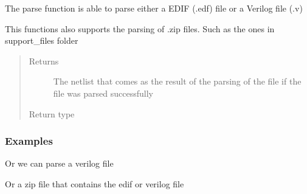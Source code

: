 \documentclass[letterpaper,10pt,english,openany,oneside]{sphinxmanual}
\begin{document}
\begin{fulllineitems}
\label{\detokenize{reference/classes/generated/spydrnet.parse:spydrnet.parse}}
The parse function is able to parse either a EDIF (.edf) file or a Verilog file (.v)

This functions also supports the parsing of .zip files. Such as the ones in support\_files folder
\begin{quote}\begin{description}
\item[{Returns}] \leavevmode
The netlist that comes as the result of the parsing of the file if the file was parsed successfully

\item[{Return type}] \leavevmode
{\hyperref[\detokenize{reference/classes/netlist:spydrnet.Netlist}]{}}

\end{description}\end{quote}
\subsubsection*{Examples}

\begin{sphinxVerbatim}[commandchars=\\\{\}]
   
  
\end{sphinxVerbatim}

Or we can parse a verilog file

\begin{sphinxVerbatim}[commandchars=\\\{\}]
  
\end{sphinxVerbatim}

Or a zip file that contains the edif or verilog file

\begin{sphinxVerbatim}[commandchars=\\\{\}]
  
\end{sphinxVerbatim}

\end{fulllineitems}
\end{document}

